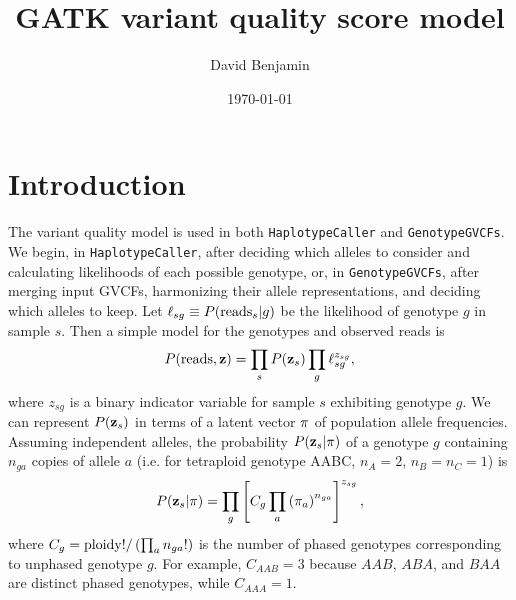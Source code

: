 \documentclass[nofootinbib,amssymb,amsmath]{revtex4}
\newcommand{\vz}{{\bf z}}
\newcommand{\vpi}{{\bf \pi}}
\newcommand{\code}[1]{\texttt{#1}}
\begin{document}
\title{GATK variant quality score model}
\author{David Benjamin}

\date{\today}

\maketitle

\section{Introduction}\label{introduction}

The variant quality model is used in both \code{HaplotypeCaller} and \code{GenotypeGVCFs}.  We begin, in \code{HaplotypeCaller}, after deciding which alleles to consider and calculating likelihoods of each possible genotype, or, in \code{GenotypeGVCFs}, after merging input GVCFs, harmonizing their allele representations, and deciding which alleles to keep. Let $\ell_{sg} \equiv P({\rm reads}_s | g)$ be the likelihood of genotype $g$ in sample $s$.  Then a simple model for the genotypes and observed reads is
\begin{equation}
P({\rm reads}, \vz) = \prod_s P(\vz_s) \prod_g \ell_{sg}^{z_{sg}}, \label{likelihood}
\end{equation}
where $z_{sg}$ is a binary indicator variable for sample $s$ exhibiting genotype $g$.  We can represent $P(\vz_s)$ in terms of a latent vector $\vpi$ of population allele frequencies.  Assuming independent alleles, the probability $P(\vz_s | \vpi)$ of a genotype $g$ containing $n_{ga}$ copies of allele $a$ (i.e. for tetraploid genotype AABC, $n_A = 2$, $n_B = n_C = 1$) is 
\begin{equation}
P(\vz_s| \vpi) = \prod_g \left[ C_g \prod_a \left( \pi_a \right)^{n_{ga}} \right]^{z_{sg}},
\label{indicator}
\end{equation}
where $C_g = {\rm ploidy}! / \left(\prod_a n_{ga}! \right)$ is the number of phased genotypes corresponding to unphased genotype $g$.  For example, $C_{AAB} = 3$ because $AAB$, $ABA$, and $BAA$ are distinct phased genotypes, while $C_{AAA} = 1$.
\end{document}
